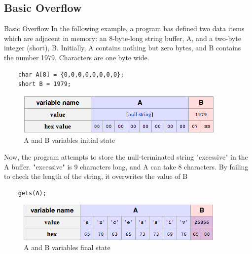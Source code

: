 \subsection{Basic Overflow}
\begin{frame}{Basic Overflow}
	In the following example, a program has defined two data items which are adjacent in memory: an 8-byte-long string buffer, A, and a two-byte integer (short), B. Initially, A contains nothing but zero bytes, and B contains the number 1979. Characters are one byte wide.
	\ccode
	\begin{lstlisting}
	char A[8] = {0,0,0,0,0,0,0,0};
	short B = 1979;
	\end{lstlisting}
	\begin{figure}
		\centering
		\includegraphics[width=\textwidth]{imgs/initialAB.png}
		\caption{A and B variables initial state}
		\label{fig:initialAB}
	\end{figure}
\framebreak
	Now, the program attempts to store the null-terminated string "excessive" in the A buffer. "excessive" is 9 characters long, and A can take 8 characters. By failing to check the length of the string, it overwrites the value of B
	\ccode
	\begin{lstlisting}
	gets(A);
	\end{lstlisting}
	\begin{figure}
		\centering
		\includegraphics[width=\textwidth]{imgs/finalAB.png}
		\caption{A and B variables final state}
		\label{fig:finalAB}
	\end{figure}
\end{frame}


